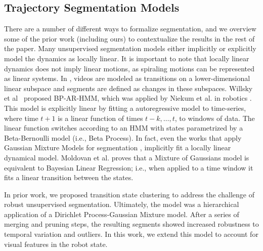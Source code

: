 \subsection{Trajectory Segmentation Models}
There are a number of different ways to formalize segmentation, and we overview some of the prior work (including ours) to contextualize the results in the rest of the paper.
Many unsupervised segmentation models either implicitly or explicitly model the dynamics as locally linear.
It is important to note that locally linear dynamics does not imply linear motions, as spiraling motions can be represented as linear systems. 
In \cite{elhamifar2009sparse}, videos are modeled as transitions on a lower-dimensional linear subspace and segments are defined as changes in these subspaces.
Willsky et al~\cite{willsky2009sharing} proposed BP-AR-HMM, which was applied by Niekum et al. in robotics \cite{niekum2012learning}.
This model is explicitly linear by fitting a autoregressive model to time-series, where time $t+1$ is a linear function of times $t-k,\ldots, t$, to windows of data. 
The linear function switches according to an HMM with states parametrized by a Beta-Bernoulli model (i.e., Beta Process). 
In fact, even the works that apply Gaussian Mixture Models for segmentation \cite{calinon2010learning, lee2015autonomous, kruger2012imitation}, implicitly fit a locally linear dynamical model.
Moldovan et al. \cite{moldovan2013dirichlet} proves that a Mixture of Gaussians model is equivalent to Bayesian Linear Regression; i.e., when applied to a time window it fits a linear transition between the states.

In prior work, we proposed transition state clustering \cite{krishnan2015tsc} to address the challenge of robust unsupervised segmentation.
Ultimately, the model was a hierarchical application of a Dirichlet Process-Gaussian Mixture model.
After a series of merging and pruning steps, the resulting segments showed increased robustness to temporal variation and outliers.
In this work, we extend this model to account for visual features in the robot state.

